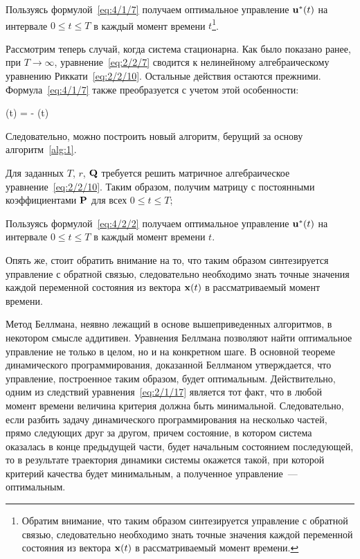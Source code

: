 		\item
			Пользуясь формулой~\ref{eq:4/1/7} получаем оптимальное управление $\mathbf{u}^{*}(t)$ на интервале $0 \leqslant t \leqslant T$ в каждый момент времени $t$\footnote{Обратим внимание, что таким образом синтезируется управление с обратной связью, следовательно необходимо знать точные значения каждой переменной состояния из вектора $\mathbf{x}(t)$ в рассматриваемый момент времени.}. 
	\eenum
\ealgo

\br

Рассмотрим теперь случай, когда система стационарна. Как было показано ранее, при $T \to \infty$, уравнение~\vref{eq:2/2/7} сводится к нелинейному алгебраическому уравнению Риккати~\vref{eq:2/2/10}. Остальные действия остаются прежними. Формула~\ref{eq:4/1/7} также преобразуется с учетом этой особенности:

	\optU(t) = -  (t) 
\eeq

Следовательно, можно построить новый алгоритм, берущий за основу алгоритм~\ref{alg:1}.

	\benum
		\item
			Для заданных $T$, $r$, $\mathbf{Q}$ требуется решить матричное алгебраическое уравнение~\ref{eq:2/2/10}. Таким образом, получим матрицу с постоянными коэффициентами $\mathbf{P}$ для всех $0 \leqslant t \leqslant T$;
			
		\item
			Пользуясь формулой~\ref{eq:4/2/2} получаем оптимальное управление $\mathbf{u}^{*}(t)$ на интервале $0 \leqslant t \leqslant T$ в каждый момент времени $t$.
	\eenum
\ealgo

Опять же, стоит обратить внимание на то, что таким образом синтезируется управление с обратной связью, следовательно необходимо знать точные значения каждой переменной состояния из вектора $\mathbf{x}(t)$ в рассматриваемый момент времени.

\br

Метод Беллмана, неявно лежащий в основе вышеприведенных алгоритмов, в некотором смысле аддитивен. Уравнения Беллмана позволяют найти оптимальное управление не только в целом, но и на конкретном шаге. В основной теореме динамического программирования, доказанной Беллманом утверждается, что управление, построенное таким образом, будет оптимальным. Действительно, одним из следствий уравнения~\vref{eq:2/1/17} является тот факт, что в любой момент времени величина критерия должна быть минимальной. Следовательно, если разбить задачу динамического программирования на несколько частей, прямо следующих друг за другом, причем состояние, в котором система оказалась в конце предыдущей части, будет начальным состоянием последующей, то в результате траектория динамики системы окажется такой, при которой критерий качества будет минимальным, а полученное управление~--- оптимальным.

